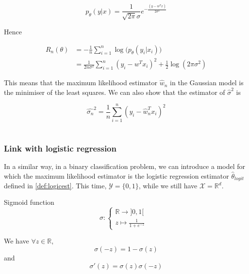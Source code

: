 \documentclass[
10pt, %
a4paper, %
oneside, %
headinclude,footinclude, %
BCOR5mm, %
]{scrartcl}
\begin{document}
\begin{equation*}
    p_{\theta}(y|x) = \frac{1}{ \sqrt{2\pi} \sigma} e^{- \frac{(y-w^Tx)}{2\sigma^2} }
\end{equation*}

Hence 

\begin{equation*}
    \begin{aligned}
	R_n(\theta) &= - \frac{1}{n} \sum^{n}_{i=1} \log\big(p_{\theta}(y_i|x_i)\big)\\
	&= \frac{1}{2n\sigma^2} \sum^{n}_{i=1} (y_i-w^Tx_i)^2+ \frac{1}{2} \log(2\pi \sigma^2)
    \end{aligned}
\end{equation*}

This means that the maximum likelihood estimator $ \hat{w}_n$ in the Gaussian model is the minimiser of the least squares. We can also show that the estimator of $ \hat{\sigma}^2$ is

\begin{equation*}
    \hat{\sigma_n}^2 = \frac{1}{n} \sum^{n}_{i=1} (y_i- \hat{w}_n^Tx_i)^2
\end{equation*}
\\

\subsubsection{\large\color{Periwinkle}Link with logistic regression}

In a similar way, in a binary classification problem, we can introduce a model for which the maximum likelihood estimator is the logistic regression estimator $\hat{\theta}_{logit}$ defined in \ref{def:logicest}. This time, $ \mathcal{Y} = \{0, 1\}$, while we still have $ \mathcal{X}=\mathbb{R}^d$.

\begin{definition}{Sigmoid function}
$$
\sigma  : \left\{
    \begin{array}{ll}
	\mathbb{R} \rightarrow ]0, 1[ \\
	z \mapsto \frac{1}{1+e^{-z}} & 
    \end{array}
\right.
$$

We have $\forall z\in \mathbb{R} $,
\begin{equation*}
    \sigma(-z) = 1- \sigma(z)
\end{equation*}
and
\begin{equation*}
    \sigma'(z) = \sigma(z)\sigma(-z)
\end{equation*}
\end{definition}
\end{document}

